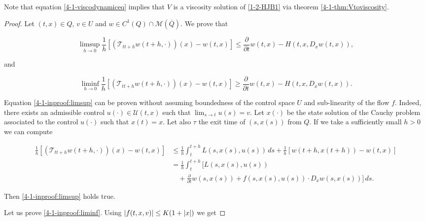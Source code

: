 \vspace{5mm}


Note that equation \ref{4-1-viscodynamiceq} implies that $V$ is a viscosity solution of \ref{1-2-HJB1} via theorem \ref{4-1-thm:Vtoviscosity}.

\vspace{5mm}

\begin{proof}

    Let $(t,x)\in Q$, $v\in U$ and $w\in C^1(Q)\cap\mathcal{M}(\overline{Q})$. We prove that
    
    \begin{equation}\label{4-1-inproof:limsup}\limsup_{h\to0}\frac{1}{h}\left[(\mathcal{T}_{tt+h}w(t+h,\cdot))(x)-w(t,x)\right]\leq\frac{\partial}{\partial t}w(t,x) - H(t,x,D_xw(t,x)),\end{equation}

    and 

    \begin{equation}\label{4-1-inproof:liminf}\liminf_{h\to0}\frac{1}{h}\left[(\mathcal{T}_{tt+h}w(t+h,\cdot))(x)-w(t,x)\right]\geq\frac{\partial}{\partial t}w(t,x) - H(t,x,D_xw(t,x)).\end{equation}
    
    Equation \ref{4-1-inproof:limsup} can be proven without assuming boundedness of the control space $U$ and sub-linearity of the flow $f$. Indeed, there exists an admissible control $u(\cdot)\in \mathcal{U}(t,x)$ 
    such that $\lim_{s\to t}u(s)=v$. Let $x(\cdot)$ be the state solution of the Cauchy problem associated 
    to the control $u(\cdot)$ such that $x(t)=x$. Let also $\tau$ the exit time of $(s,x(s))$ from $Q$. If we take a sufficiently small $h>0$ we can compute
    
    \begin{align*}
        \frac{1}{h}\left[(\mathcal{T}_{tt+h}w(t+h,\cdot))(x)-w(t,x)\right] & \leq \frac{1}{h}\int_t^{t+h}L(s,x(s),u(s))\,ds + \frac{1}{h}\left[w(t+h,x(t+h))-w(t,x)\right] \\
        & =  \frac{1}{h}\int_t^{t+h}\bigg[L(s,x(s),u(s)) \\ 
        & \quad + \frac{\partial}{\partial t}w(s,x(s)) + f(s,x(s),u(s))\cdot D_xw(s,x(s))\bigg]\,ds.
    \end{align*}
    
    Then \ref{4-1-inproof:limsup} holds true. 
    
    Let us prove \ref{4-1-inproof:liminf}. Using $\abs{f(t,x,v)}\leq K(1+\abs{x})$ we get


\end{proof}
